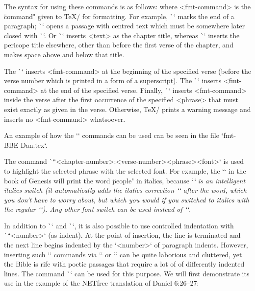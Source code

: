 The syntax for using these commands is as follows:
\begtt
{}
\endtt
where <fmt-command> is the \"command" given to \TeX/ for formatting.
For example, \`\endgraf` marks the end of a paragraph; \`\begcenter` opens a passage with
centred text which must be somewhere later closed  with \`\endcenter`. Or 
\`` inserts <text> as the chapter title, whereas
\`` inserts the pericope title elsewhere, other than before the first verse of the chapter, and makes space above and below that title.

The \`\fmtpre`  inserts <fmt-command>
at the beginning of the specified verse (before the verse number which is printed in a form 
of a superscript). 
The \`\fmtadd`  inserts <fmt-command> at the end of the specified verse.
Finally, \`\fmtins` inserts <fmt-command> inside the verse after the first occurrence of the 
specified <phrase> that must exist exactly as given in the verse. Otherwise, \TeX/ prints a warning 
message and inserts no <fmt-command> whatsoever.

An example of how the `\fmt*` commands can be used can be seen in the file
`fmt-BBE-Dan.tex`.

The command \`\fmtfont``{<chapter-number>:<verse-number>}{<phrase>}{<font>}`
is used to highlight the selected phrase with the selected font.
For example, the `` in the book of Genesis will print the word
\"people"  in italics, because `\em` is an intelligent italics switch (it automatically adds the italics correction `\/` after the word, which you don't have to worry about, but which you would if you switched to italics with the regular `\it`).
Any other font switch can be used instead of `\em`.

In addition to \`\begcenter` and \`\endcenter`, it is also possible to use controlled 
indentation with \`\ind``<number>` (as indent). 
At the point of insertion, the line is terminated and the next line begins indented by the
`<number>` of paragraph indents. However, inserting such `\ind` commands
via `\fmtins` or `\fmtpre` can be quite laborious and
cluttered, yet the Bible is rife with poetic passages that require a lot of
of differently indented lines. The command \`\fmtpoetry` can be used for this purpose.
We will first demonstrate its use in the example of the NETfree translation of 
Daniel 6:26--27:

